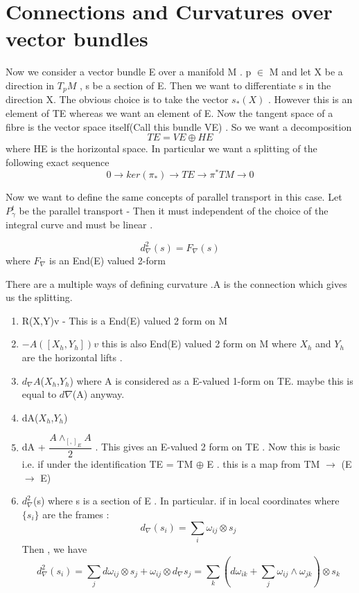\documentclass[psamsfonts]{amsart}
\theoremstyle{definition}
\theoremstyle{remark}
\numberwithin{equation}{section}
\begin{document}
\section{Connections and Curvatures over vector bundles}

Now we consider a vector bundle E over a manifold M . p $\in$ M and let X be a direction in $T_{p}M$ , s be a section of E. Then we want  to differentiate s in the direction X. The obvious choice is to take the vector $s_{*}(X)$ . However this is an element of TE whereas we want an element of E.  Now the tangent space of a fibre is the vector space itself(Call this bundle VE) . So we want a decomposition 
\[            TE = VE \oplus HE                       \]    
where HE is the horizontal space. In particular we want a splitting of the following exact sequence 
\[      0 \rightarrow ker(\pi_{*}) \rightarrow TE \rightarrow \pi^{*}TM \rightarrow 0                                    \]


 Now we want to define the same concepts of parallel transport in this case. Let $P^{t}_{\gamma}$ be the parallel transport - Then it must independent of the choice of the integral curve and must be linear .
                     


\[       d_{\nabla}^{2} (s) =   F_{\nabla}(s)                           \]
where $F_{\nabla}$ is an End(E) valued 2-form 


There are a multiple ways of defining curvature .A is the connection which gives us the splitting. 
\begin{enumerate}
	\item R(X,Y)v - This is a End(E) valued 2 form on M
	\item  $-A([X_{h},Y_{h}])v$ this is also End(E) valued 2 form on M where $X_{h}$ and $Y_{h}$ are the horizontal lifts . 
	\item $d_{\nabla}A$($X_{h}$,$Y_{h}$) where A is considered as a E-valued 1-form on TE. maybe this is equal to $d{\nabla}$(A) anyway.
	\item dA($X_{h}$,$Y_{h}$)
	\item dA + $\dfrac{A \wedge_{[,]_{E}} A}{2}$ . This gives an E-valued 2 form on TE . Now this is basic i.e. if under the identification TE = TM $\oplus$ E . this is  a map from TM $\to$ (E $\to$ E)
	\item $d_{\nabla}^{2}$(s) where s is a section of E . In particular. if in local coordinates where $\{s_{i}\}$ are the frames : 
	\[     d_{\nabla}(s_{i}) = \sum_{i} \omega_{ij} \otimes s_{j}                                    \]
	Then , we have 
	\[     d_{\nabla}^{2}(s_{i}) =                                   \sum_{j} d\omega_{ij} \otimes s_{j} + \omega_{ij} \otimes d_{\nabla} s_{j} 
	= \sum _{k} (d\omega_{ik} + \sum_{j} \omega_{ij} \wedge \omega_{jk}) \otimes s_{k}         \]
\end{enumerate}
\end{document}
